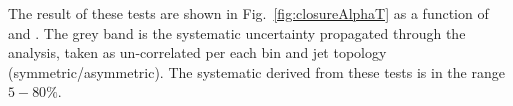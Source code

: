 The result of these tests are shown in Fig.~\ref{fig:closureAlphaT} as a function of \scalht and \njet. 
The grey band is the systematic uncertainty propagated through the analysis, 
taken as un-correlated per each \scalht bin and jet topology
(symmetric/asymmetric). The systematic derived from these tests is
in the range $5-80\%$.


\begin{figure}[h!]
  \begin{center}
    ~~
    \\
    ~~


\end{center}
\end{figure}
